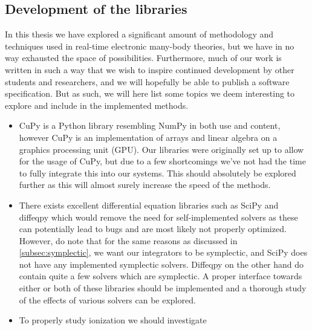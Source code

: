         \subsection{Development of the libraries}
            In this thesis we have explored a significant amount of methodology
            and techniques used in real-time electronic many-body theories, but
            we have in no way exhausted the space of possibilities.
            Furthermore, much of our work is written in such a way that we wish
            to inspire continued development by other students and researchers,
            and we will hopefully be able to publish a software specification.
            But as such, we will here list some topics we deem interesting to
            explore and include in the implemented methods.
            \begin{itemize}
                \item CuPy \cite{cupy} is a Python library resembling NumPy
                    \cite{numpy} in both use and content, however CuPy is an
                    implementation of arrays and linear algebra on a graphics
                    processing unit (GPU).
                    Our libraries were originally set up to allow for the usage
                    of CuPy, but due to a few shortcomings we've not had the
                    time to fully integrate this into our systems.
                    This should absolutely be explored
                    further as this will almost surely increase the speed of the
                    methods.
                \item There exists excellent differential equation libraries
                    such as SciPy \cite{scipy} and diffeqpy \cite{julia-diff}
                    which would remove the need for self-implemented solvers as
                    these can potentially lead to bugs and are most likely not
                    properly optimized.
                    However, do note that for the same reasons as discussed in
                    \autoref{subsec:symplectic}, we want our integrators to be
                    symplectic, and SciPy does not have any implemented
                    symplectic solvers.
                    Diffeqpy on the other hand do contain quite a few solvers
                    which are symplectic.
                    A proper interface towards either or both of these libraries
                    should be implemented and a thorough study of the effects of
                    various solvers can be explored.
                \item To properly study ionization we should investigate

\end{itemize}
